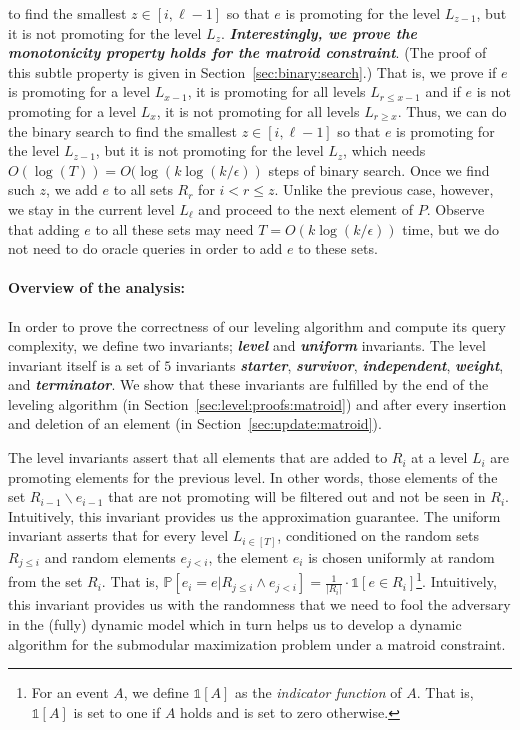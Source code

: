\documentclass[11pt]{article}
\newcommand{\mO}{O}
\renewcommand{\Pr}[1]{\ensuremath{\mathbb{P}\left[#1\right]}}
\newcommand{\ind}[1]{\ensuremath{\mathds{1}\left[#1\right]}}
\begin{document}
\begin{itemize}
    to find the smallest $z \in [i,\ell-1]$ so that 
    $e$ is promoting  for the level $L_{z-1}$, but it is not promoting  for the level $L_{z}$. 
    \textbf{\textit{Interestingly, we prove the monotonicity property holds for the matroid constraint}}. 
    (The proof of this subtle property is given in Section~\ref{sec:binary:search}.)
    That is, we prove if $e$ is promoting for a level $L_{x-1}$, 
    it is promoting for all levels $L_{r \le x-1}$ and if $e$ is not promoting for a level $L_{x}$, 
    it is not promoting for all levels $L_{r \ge x}$. 
    Thus, we can do the binary search to find the smallest $z \in [i,\ell-1]$ so that 
    $e$ is promoting  for the level $L_{z-1}$, but it is not promoting  for the level $L_{z}$, which needs $\mO(\log(T))=\mO(\log(k\log(k/\epsilon))$ steps of binary search.     
    Once we find such  $z$, we add $e$ to all sets $R_{r}$ for $i < r \le z$. 
    Unlike the previous case, however,  we stay in 
    the current level $L_{\ell}$ and proceed to the next element of $P$.
    Observe that adding $e$ to all these sets 
    may need $ T = \mO(k\log(k/\epsilon))$ time, but we do not need to do oracle queries in order to add 
    $e$ to these sets.
\end{itemize}


\paragraph{Overview of the analysis:}
In order to prove the correctness of our leveling algorithm and compute its query complexity, 
we define two invariants; \textbf{\textit{level}} and \textbf{\textit{uniform}} invariants.  
The level invariant itself is a set of $5$ invariants \textbf{\textit{starter}}, \textbf{\textit{survivor}}, 
\textbf{\textit{independent}}, \textbf{\textit{weight}}, and \textbf{\textit{terminator}}. 
We show that these invariants are fulfilled by the end of the leveling algorithm (in Section~\ref{sec:level:proofs:matroid})
and after every insertion and deletion of an element (in Section~\ref{sec:update:matroid}). 

The level invariants assert that all elements that are added to $R_i$ at a level $L_i$ 
are promoting elements for the previous level. 
In other words, those elements of the set $R_{i-1}\backslash e_{i-1}$ 
that are not promoting will be filtered out and not be seen in $R_i$. 
Intuitively, this invariant provides us the approximation guarantee.
The uniform invariant asserts that for every level $L_{i \in [T]}$, 
conditioned on the random sets $R_{j \le i}$ and random elements $e_{j < i}$, 
the element $e_i$ is chosen uniformly at random from the set $R_i$. 
That is, $\Pr{e_i = e | R_{j \le i} \wedge e_{j < i}} = \frac{1}{|R_i|} \cdot \ind{e \in R_i}$\footnote{For an event $A$, we define $\ind{A}$ as the \emph{indicator function} of $A$.
That is, $\ind{A}$ is set to one if $A$ holds and is set to zero otherwise. }.
Intuitively, this invariant provides us with the randomness that we need  
to fool the adversary in the (fully) dynamic model 
which in turn helps us to develop a dynamic algorithm 
for the submodular maximization problem under a matroid constraint. 
\end{document}
